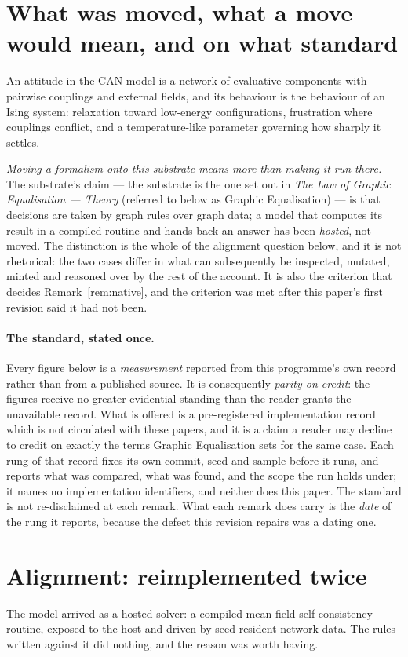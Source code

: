 \documentclass[11pt,a4paper]{article}
\theoremstyle{remark}
\begin{document}
\section{What was moved, what a move would mean, and on what standard}\label{sec:moved}
An attitude in the CAN model is a network of evaluative components with pairwise couplings and
external fields, and its behaviour is the behaviour of an Ising system: relaxation toward low-energy
configurations, frustration where couplings conflict, and a temperature-like parameter governing how
sharply it settles.

\emph{Moving a formalism onto this substrate means more than making it run there.} The substrate's
claim --- the substrate is the one set out in \emph{The Law of Graphic Equalisation --- Theory}
(referred to below as Graphic Equalisation) --- is that decisions are taken by graph rules over graph
data; a model that computes its result in a compiled routine and hands back an answer has been
\emph{hosted}, not moved. The distinction is the whole of the alignment question below, and it is not
rhetorical: the two cases differ in what can subsequently be inspected, mutated, minted and reasoned
over by the rest of the account. It is also the criterion that decides Remark~\ref{rem:native}, and
the criterion was met after this paper's first revision said it had not been.

\paragraph{The standard, stated once.} Every figure below is a \emph{measurement} reported from this
programme's own record rather than from a published source. It is consequently \emph{parity-on-credit}:
the figures receive no greater evidential standing than the reader grants the unavailable record.
What is offered is a pre-registered
implementation record which is not circulated with these papers, and it is a claim a reader may
decline to credit on exactly the terms Graphic Equalisation sets for the same case. Each rung of that
record fixes its own commit, seed and sample before it runs, and reports what was compared, what was
found, and the scope the run holds under; it names no implementation identifiers, and neither does
this paper. The standard is not re-disclaimed at each remark. What each remark does carry is the
\emph{date} of the rung it reports, because the defect this revision repairs was a dating one.

\section{Alignment: reimplemented twice}\label{sec:alignment}
The model arrived as a hosted solver: a compiled mean-field self-consistency routine, exposed to the
host and driven by seed-resident network data. The rules written against it did nothing, and the
reason was worth having.
\end{document}
